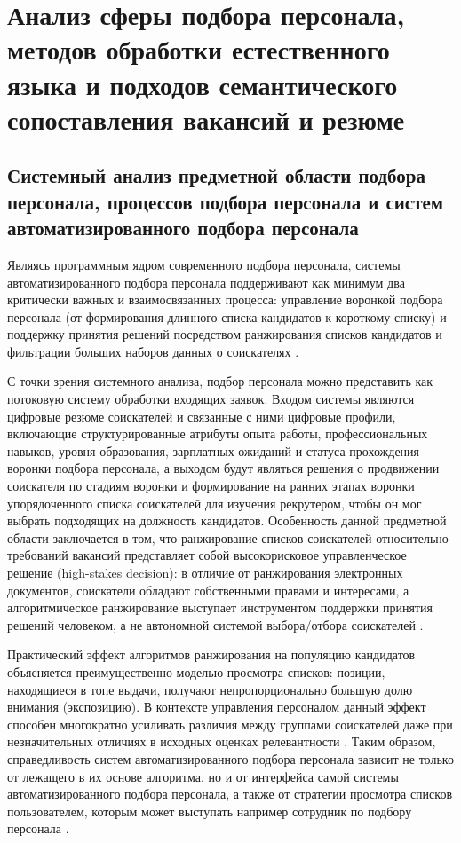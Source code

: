 \chapter{Анализ сферы подбора персонала, методов обработки естественного языка и подходов семантического сопоставления вакансий и резюме}
\label{chapter:analysis}
\section{Системный анализ предметной области подбора персонала, процессов подбора персонала и систем автоматизированного подбора персонала}
Являясь программным ядром современного подбора персонала, системы автоматизированного подбора персонала поддерживают как минимум два критически важных и взаимосвязанных процесса: управление воронкой подбора персонала (от формирования длинного списка кандидатов к короткому списку) и поддержку принятия решений посредством ранжирования списков кандидатов и фильтрации больших наборов данных о соискателях \cite{src02}.\par
С точки зрения системного анализа, подбор персонала можно представить как потоковую систему обработки входящих заявок. Входом системы являются цифровые резюме соискателей и связанные с ними цифровые профили, включающие структурированные атрибуты опыта работы, профессиональных навыков, уровня образования, зарплатных ожиданий и статуса прохождения воронки подбора персонала, а выходом будут являться решения о продвижении соискателя по стадиям воронки и формирование на ранних этапах воронки упорядоченного списка соискателей для изучения рекрутером, чтобы он мог выбрать подходящих на должность кандидатов. Особенность данной предметной области заключается в том, что ранжирование списков соискателей относительно требований вакансий представляет собой высокорисковое управленческое решение (high-stakes decision): в отличие от ранжирования электронных документов, соискатели обладают собственными правами и интересами, а алгоритмическое ранжирование выступает инструментом поддержки принятия решений человеком, а не автономной системой выбора/отбора соискателей \cite{src02}.\par
Практический эффект алгоритмов ранжирования на популяцию кандидатов объясняется преимущественно моделью просмотра списков: позиции, находящиеся в топе выдачи, получают непропорционально большую долю внимания (экспозицию). В контексте управления персоналом данный эффект способен многократно усиливать различия между группами соискателей даже при незначительных отличиях в исходных оценках релевантности \cite{src02}. Таким образом, справедливость систем автоматизированного подбора персонала зависит не только от лежащего в их основе алгоритма, но и от интерфейса самой системы автоматизированного подбора персонала, а также от стратегии просмотра списков пользователем, которым может выступать например сотрудник по подбору персонала \cite{src02}.\par
